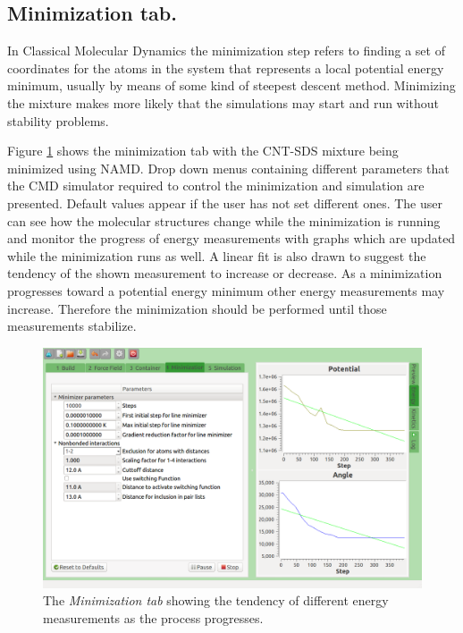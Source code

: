 \documentclass{article}
\begin{document}
\subsection{Minimization tab.}  In Classical Molecular Dynamics the minimization step refers to finding a set of coordinates for the atoms in the system that represents a local potential energy minimum, usually by means of some kind of steepest descent method.  Minimizing the mixture makes more likely that the simulations may start and run without stability problems. 

Figure \ref{fig:minimizationTab} shows the minimization tab with the CNT-SDS mixture being minimized using NAMD.  Drop down menus containing different parameters that the CMD simulator required to control the minimization and simulation are presented.  Default values appear if the user has not set different ones.  The user can see how the molecular structures change while the minimization is running and monitor the progress of energy measurements with graphs which are updated while the minimization runs as well.  A linear fit is also drawn to suggest the tendency of the shown measurement to increase or decrease.  As a minimization progresses toward a potential energy minimum other energy measurements may increase.  Therefore the minimization should be performed until those measurements stabilize.  


\begin{figure}
\begin{center}
  \includegraphics[scale=0.4]{minimizationTab.png} 
  \caption{The \textit{Minimization tab} showing the tendency of different energy measurements as the process progresses.}
  \label{fig:minimizationTab}

\end{center}\end{figure}
\end{document}
